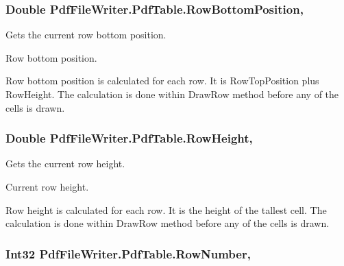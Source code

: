 \subsubsection[{\texorpdfstring{Row\+Bottom\+Position}{RowBottomPosition}}]{\setlength{\rightskip}{0pt plus 5cm}Double Pdf\+File\+Writer.\+Pdf\+Table.\+Row\+Bottom\+Position\hspace{0.3cm}{\ttfamily [get]}, {\ttfamily [set]}}\hypertarget{class_pdf_file_writer_1_1_pdf_table_a1373238391e02c813a3c2e31295a12bb}{}\label{class_pdf_file_writer_1_1_pdf_table_a1373238391e02c813a3c2e31295a12bb}


Gets the current row bottom position. 

Row bottom position.

Row bottom position is calculated for each row. It is Row\+Top\+Position plus Row\+Height. The calculation is done within Draw\+Row method before any of the cells is drawn. 
\subsubsection[{\texorpdfstring{Row\+Height}{RowHeight}}]{\setlength{\rightskip}{0pt plus 5cm}Double Pdf\+File\+Writer.\+Pdf\+Table.\+Row\+Height\hspace{0.3cm}{\ttfamily [get]}, {\ttfamily [set]}}\hypertarget{class_pdf_file_writer_1_1_pdf_table_aff27db154d5cf0f51b7dbee0c0339d29}{}\label{class_pdf_file_writer_1_1_pdf_table_aff27db154d5cf0f51b7dbee0c0339d29}


Gets the current row height. 

Current row height.

Row height is calculated for each row. It is the height of the tallest cell. The calculation is done within Draw\+Row method before any of the cells is drawn. 
\subsubsection[{\texorpdfstring{Row\+Number}{RowNumber}}]{\setlength{\rightskip}{0pt plus 5cm}Int32 Pdf\+File\+Writer.\+Pdf\+Table.\+Row\+Number\hspace{0.3cm}{\ttfamily [get]}, {\ttfamily [set]}}\hypertarget{class_pdf_file_writer_1_1_pdf_table_ab6a1a8de50542d8e9ae8b23e1514fdfe}{}\label{class_pdf_file_writer_1_1_pdf_table_ab6a1a8de50542d8e9ae8b23e1514fdfe}


